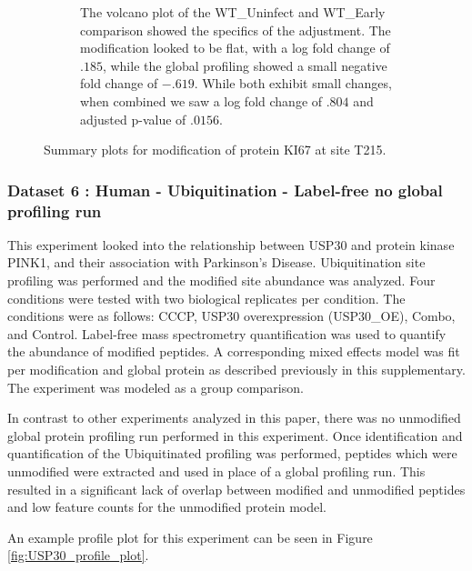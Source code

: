 \documentclass{mcp}
\begin{document}
\begin{figure}[h!]
\begin{subfigure}{\textwidth}
	\caption{The volcano plot of the WT\_Uninfect and WT\_Early comparison showed the specifics of the adjustment. The modification looked to be flat, with a log fold change of $.185$, while the global profiling showed a small negative fold change of $-.619$. While both exhibit small changes, when combined we saw a log fold change of $.804$ and adjusted p-value of $.0156$.}
 \end{subfigure}
 \caption{Summary plots for modification of protein KI67 at site T215.}
\label{fig:Diff_Shigella_PTM}
\end{figure}

\clearpage

\subsubsection{Dataset 6 : Human - Ubiquitination - Label-free no global profiling run}
\label{sec:usp30}

This experiment looked into the relationship between USP30 and protein kinase PINK1, and their association with Parkinson's Disease. Ubiquitination site profiling was performed and the modified site abundance was analyzed. Four conditions were tested with two biological replicates per condition. The conditions were as follows: CCCP, USP30 overexpression (USP30\_OE), Combo, and Control. Label-free mass spectrometry quantification was used to quantify the abundance of modified peptides. A corresponding mixed effects model was fit per modification and global protein as described previously in this supplementary. The experiment was modeled as a group comparison.

In contrast to other experiments analyzed in this paper, there was no unmodified global protein profiling run performed in this experiment. Once identification and quantification of the Ubiquitinated profiling was performed, peptides which were unmodified were extracted and used in place of a global profiling run. This resulted in a significant lack of overlap between modified and unmodified peptides and low feature counts for the unmodified protein model.

An example profile plot for this experiment can be seen in  Figure \ref{fig:USP30_profile_plot}.
\end{document}
